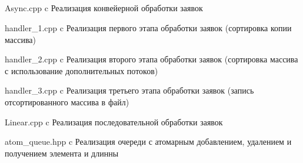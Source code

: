 \begin{appendices}
	\chapter{}
	{Async.cpp} %
	{c} %
	{Реализация конвейерной обработки заявок} %
	
	{handler_1.cpp} %
	{c} %
	{Реализация первого этапа обработки заявок (сортировка копии массива)} %
	
	{handler_2.cpp} %
	{c} %
	{Реализация второго этапа обработки заявок (сортировка массива с использование дополнительных потоков)} %
	
	{handler_3.cpp} %
	{c} %
	{Реализация третьего этапа обработки заявок (запись отсортированного массива в файл)} %
	
	{Linear.cpp} %
	{c} %
	{Реализация последовательной обработки заявок} %
	
	{atom_queue.hpp} %
	{c} %
	{Реализация очереди с атомарным добавлением, удалением и получением элемента и длинны} %
\end{appendices}
	
	
	